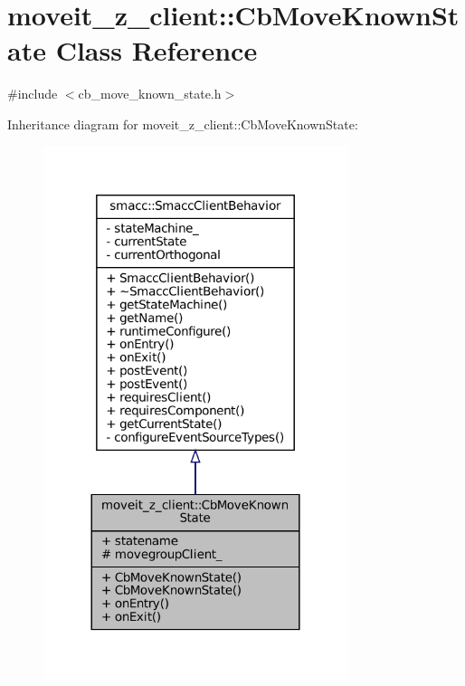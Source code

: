 \hypertarget{classmoveit__z__client_1_1CbMoveKnownState}{}\section{moveit\+\_\+z\+\_\+client\+:\+:Cb\+Move\+Known\+State Class Reference}
\label{classmoveit__z__client_1_1CbMoveKnownState}


{\ttfamily \#include $<$cb\+\_\+move\+\_\+known\+\_\+state.\+h$>$}



Inheritance diagram for moveit\+\_\+z\+\_\+client\+:\+:Cb\+Move\+Known\+State\+:
\nopagebreak
\begin{figure}[H]
\begin{center}
\leavevmode
\includegraphics[width=252pt]{classmoveit__z__client_1_1CbMoveKnownState__inherit__graph}
\end{center}
\end{figure}


